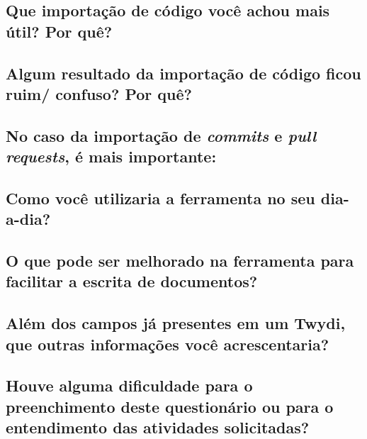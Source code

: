 \subsection{Que importação de código você achou mais útil? Por quê?}

\subsection{Algum resultado da importação de código ficou ruim/ confuso? Por quê?}

\subsection{No caso da importação de \textit{commits} e \textit{pull requests}, é mais importante: }

\subsection{Como você utilizaria a ferramenta no seu dia-a-dia?}

\subsection{O que pode ser melhorado na ferramenta para facilitar a escrita de documentos?}

\subsection{Além dos campos já presentes em um Twydi, que outras informações você acrescentaria?}

\subsection{Houve alguma dificuldade para o preenchimento deste questionário ou para o entendimento das atividades solicitadas?}

